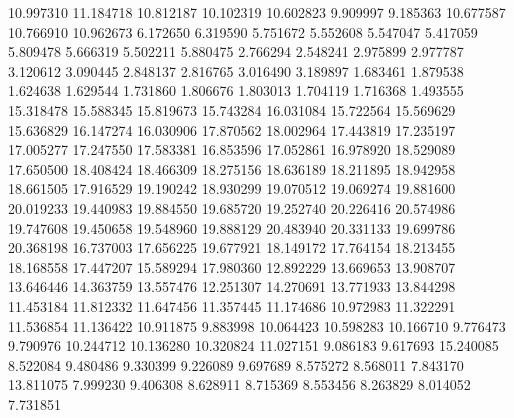 10.997310
11.184718
10.812187
10.102319
10.602823
9.909997
9.185363
10.677587
10.766910
10.962673
6.172650
6.319590
5.751672
5.552608
5.547047
5.417059
5.809478
5.666319
5.502211
5.880475
2.766294
2.548241
2.975899
2.977787
3.120612
3.090445
2.848137
2.816765
3.016490
3.189897
1.683461
1.879538
1.624638
1.629544
1.731860
1.806676
1.803013
1.704119
1.716368
1.493555
15.318478
15.588345
15.819673
15.743284
16.031084
15.722564
15.569629
15.636829
16.147274
16.030906
17.870562
18.002964
17.443819
17.235197
17.005277
17.247550
17.583381
16.853596
17.052861
16.978920
18.529089
17.650500
18.408424
18.466309
18.275156
18.636189
18.211895
18.942958
18.661505
17.916529
19.190242
18.930299
19.070512
19.069274
19.881600
20.019233
19.440983
19.884550
19.685720
19.252740
20.226416
20.574986
19.747608
19.450658
19.548960
19.888129
20.483940
20.331133
19.699786
20.368198
16.737003
17.656225
19.677921
18.149172
17.764154
18.213455
18.168558
17.447207
15.589294
17.980360
12.892229
13.669653
13.908707
13.646446
14.363759
13.557476
12.251307
14.270691
13.771933
13.844298
11.453184
11.812332
11.647456
11.357445
11.174686
10.972983
11.322291
11.536854
11.136422
10.911875
9.883998
10.064423
10.598283
10.166710
9.776473
9.790976
10.244712
10.136280
10.320824
11.027151
9.086183
9.617693
15.240085
8.522084
9.480486
9.330399
9.226089
9.697689
8.575272
8.568011
7.843170
13.811075
7.999230
9.406308
8.628911
8.715369
8.553456
8.263829
8.014052
7.731851
